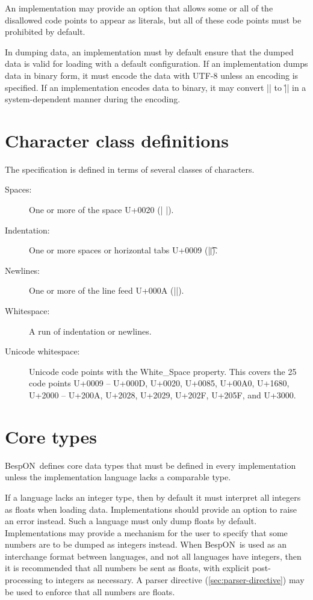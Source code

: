 \documentclass[11pt]{article}
\newcommand{\bespon}{BespON}
\begin{document}
An implementation may provide an option that allows some or all of the disallowed code points to appear as literals, but all of these code points must be prohibited by default.

In dumping data, an implementation must by default ensure that the dumped data is valid for loading with a default configuration.  If an implementation dumps data in binary form, it must encode the data with UTF-8 unless an encoding is specified.  If an implementation encodes data to binary, it may convert |\n| to |\r\n| in a system-dependent manner during the encoding.




\section{Character class definitions}
The specification is defined in terms of several classes of characters.
\begin{description}
\item[Spaces:]  One or more of the space U+0020 (| |).
\item[Indentation:]  One or more spaces or horizontal tabs U+0009 (|\t|).
\item[Newlines:]  One or more of the line feed U+000A (|\n|).
\item[Whitespace:]  A run of indentation or newlines.
\item[Unicode whitespace:]  Unicode code points with the White\_Space property.  This covers the 25 code points U+0009 -- U+000D, U+0020, U+0085, U+00A0, U+1680, U+2000 -- U+200A, U+2028, U+2029, U+202F, U+205F, and U+3000.
\end{description}





\section{Core types}

\bespon\ defines core data types that must be defined in every implementation unless the implementation language lacks a comparable type.

If a language lacks an integer type, then by default it must interpret all integers as floats when loading data.  Implementations should provide an option to raise an error instead.  Such a language must only dump floats by default.  Implementations may provide a mechanism for the user to specify that some numbers are to be dumped as integers instead.  When \bespon\ is used as an interchange format between languages, and not all languages have integers, then it is recommended that all numbers be sent as floats, with explicit post-processing to integers as necessary.  A parser directive (\cref{sec:parser-directive}) may be used to enforce that all numbers are floats.
\end{document}
